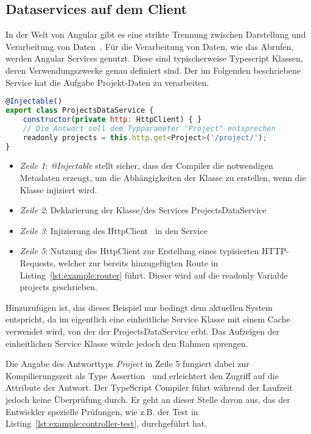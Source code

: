 \subsection{Dataservices auf dem Client}
\label{sec:requirements:example:service}
In der Welt von Angular gibt es eine strikte Trennung zwischen Darstellung und Verarbeitung von Daten~\cite{angular-service}.
Für die Verarbeitung von Daten, wie das Abrufen, werden Angular Services genutzt. Diese sind typischerweise Typescript Klassen,
deren Verwendungszwecke genau definiert sind. Der im Folgenden beschriebene Service hat die Aufgabe Projekt-Daten zu verarbeiten.

\begin{lstlisting}[language=JavaScript,float=h!,caption={Funktion zum Abruf aller Projekte vom Server}, label={lst:example:service}]
@Injectable()
export class ProjectsDataService {
    constructor(private http: HttpClient) { }
    // Die Antwort soll dem Typparameter "Project" entsprechen
    readonly projects = this.http.get<Project>('/project/');
}
\end{lstlisting}

\begin{itemize}
    \setlength\itemsep{-1em}
    \item \emph{Zeile 1}: \emph{@Injectable} stellt sicher, dass der Compiler die notwendigen Metadaten erzeugt, um die Abhängigkeiten der Klasse zu erstellen, wenn die Klasse injiziert wird.
    \item \emph{Zeile 2}: Deklarierung der Klasse/des Services ProjectsDataService
    \item \emph{Zeile 3}: Injizierung des HttpClient~\cite{angular-http} in den Service
    \item \emph{Zeile 5}: Nutzung des HttpClient zur Erstellung eines typisierten HTTP-Requests, welcher zur bereits hinzugefügten Route in Listing~\ref{lst:example:router} führt.
    Dieser wird auf die readonly Variable projects geschrieben.
\end{itemize}

Hinzuzufügen ist, das dieses Beispiel nur bedingt dem aktuellen System entspricht, da im eigentlich eine einheitliche Service Klasse mit einem Cache verwendet wird, von der der ProjectsDataService erbt. Das Aufzeigen der einheitlichen Service Klasse würde jedoch den Rahmen sprengen.

Die Angabe des Antworttyps \emph{Project} in Zeile 5 fungiert dabei zur Kompilierungszeit als Type Assertion~\cite{typescript-typeassertion}
und erleichtert den Zugriff auf die Attribute der Antwort. Der TypeScript Compiler führt während der Laufzeit jedoch keine Überprüfung durch.
Er geht an dieser Stelle davon aus, das der Entwickler spezielle Prüfungen, wie z.B. der Test in Listing~\ref{lst:example:controller-test}, durchgeführt hat.


